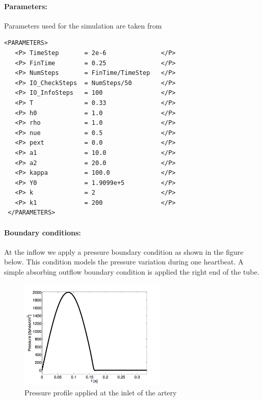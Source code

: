 \paragraph{Parameters:~} Parameters used for the simulation are taken from \cite{Sherwin2003} 
\begin{lstlisting}[style=XMLStyle] 
<PARAMETERS>
   <P> TimeStep       = 2e-6               </P> 
   <P> FinTime        = 0.25               </P>
   <P> NumSteps       = FinTime/TimeStep   </P>
   <P> IO_CheckSteps  = NumSteps/50        </P>
   <P> IO_InfoSteps   = 100                </P>
   <P> T              = 0.33               </P>
   <P> h0             = 1.0                </P>
   <P> rho            = 1.0                </P>
   <P> nue            = 0.5                </P>
   <P> pext           = 0.0                </P> 
   <P> a1             = 10.0               </P> 
   <P> a2             = 20.0               </P> 
   <P> kappa          = 100.0              </P> 
   <P> Y0             = 1.9099e+5          </P> 
   <P> k              = 2                  </P> 
   <P> k1             = 200                </P> 
 </PARAMETERS>
\end{lstlisting}

\paragraph{Boundary conditions:~} At the inflow we apply a pressure boundary condition as shown in the figure below. This condition models the pressure variation during one heartbeat. A simple absorbing outflow boundary condition is applied the right end of the tube.

\begin{figure}
\begin{center}
\includegraphics[width=7cm]{Figures/StentPressureProfile.png}
\caption{Pressure profile applied at the inlet of the artery}
\end{center}
\end{figure}

